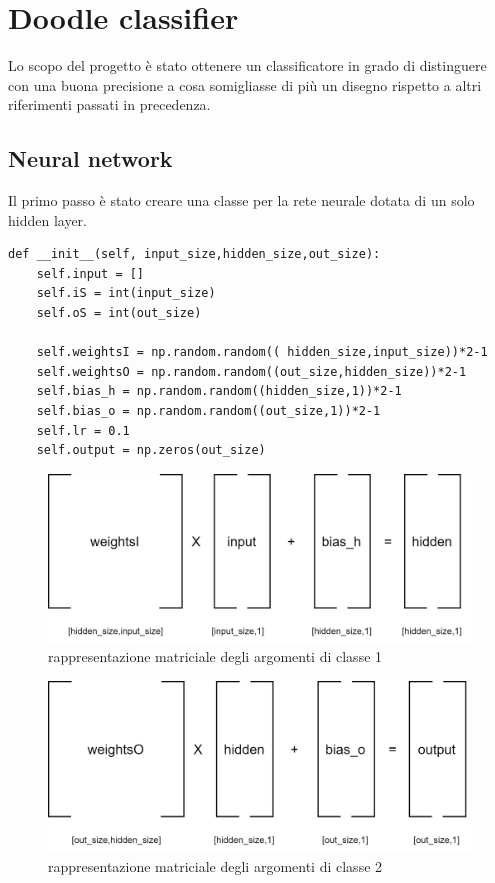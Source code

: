 \documentclass[12pt]{article}
\begin{document}
\section{Doodle classifier}
Lo scopo del progetto è stato ottenere un classificatore in grado di distinguere con una buona precisione a cosa somigliasse di più un disegno rispetto a altri riferimenti passati in precedenza.
\subsection{Neural network}
Il primo passo è stato creare una classe per la rete neurale dotata di un solo hidden layer. 
\begin{lstlisting}[language=myPython]
 def __init__(self, input_size,hidden_size,out_size):
	self.input = []
	self.iS = int(input_size)
	self.oS = int(out_size)

	self.weightsI = np.random.random(( hidden_size,input_size))*2-1
	self.weightsO = np.random.random((out_size,hidden_size))*2-1
	self.bias_h = np.random.random((hidden_size,1))*2-1
	self.bias_o = np.random.random((out_size,1))*2-1
	self.lr = 0.1
	self.output = np.zeros(out_size)
\end{lstlisting}
\begin{figure}[h!]
	\centering
	\includegraphics[width=10 cm]{resources/hidden.png}
	\caption{rappresentazione matriciale degli argomenti di classe 1}
	\label{fig:hidden}
\end{figure}
\begin{figure}[h!]
	\centering
	\includegraphics[width=10 cm]{resources/output.png}
	\caption{rappresentazione matriciale degli argomenti di classe 2}
	\label{fig:output}
\end{figure}
\end{document}
